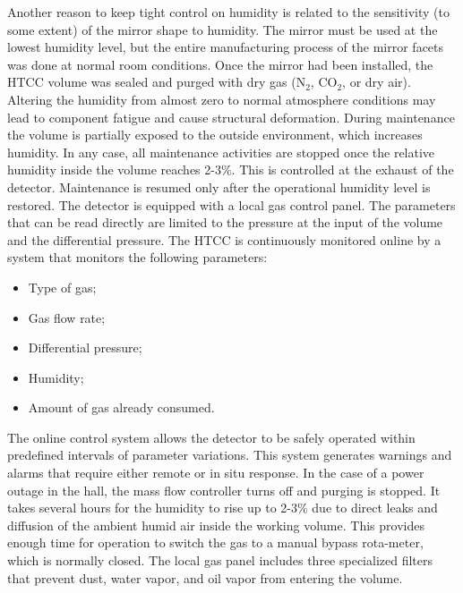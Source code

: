 Another reason to keep tight control on humidity is related to the sensitivity (to some extent) of the mirror shape
to humidity. The mirror must be used at the lowest humidity level, but the entire manufacturing process of the
mirror facets was done at normal room conditions. Once the mirror had been installed, the HTCC volume was sealed
and purged with dry gas (N${_2}$, CO${_2}$, or dry air). Altering the humidity from almost zero to normal
atmosphere conditions may lead to component fatigue and cause structural deformation. During maintenance the
volume is partially exposed to the outside environment, which increases humidity. In any case, all maintenance
activities are stopped once the relative humidity inside the volume reaches 2-3\%. This is controlled at the exhaust
of the detector. Maintenance is resumed only after the operational humidity level is restored. The detector is
equipped with a local gas control panel. The parameters that can be read directly are limited to the pressure at the
input of the volume and the differential pressure. The HTCC is continuously monitored online by a system that
monitors the following parameters:

\begin{itemize}
    \item Type of gas;
    \item Gas flow rate;
    \item Differential pressure;
    \item Humidity;
    \item Amount of gas already consumed.
\end{itemize}

The online control system allows the detector to be safely operated within predefined intervals of parameter
variations. This system generates warnings and alarms that require either remote or in situ response. In the case of
a power outage in the hall, the mass flow controller turns off and purging is stopped. It takes several hours for the
humidity to rise up to 2-3\% due to direct leaks and diffusion of the ambient humid air inside the working volume.
This provides enough time for operation to switch the gas to a manual bypass rota-meter, which is normally closed.
The local gas panel includes three specialized filters that prevent dust, water vapor, and oil vapor from entering
the volume.

